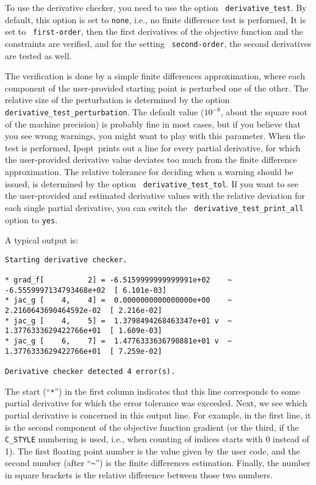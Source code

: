 \documentclass[10pt]{article}
\newcommand{\Ipopt}{{\sc Ipopt}}
\begin{document}
To use the derivative checker, you need to use the option {\tt
  derivative\_test}.  By default, this option is set to {\tt none},
i.e., no finite difference test is performed,  It is set to {\tt
  first-order}, then the first derivatives of the objective function
and the constraints are verified, and for the setting {\tt
  second-order}, the second derivatives are tested as well.

The verification is done by a simple finite differences approximation,
where each component of the user-provided starting point is perturbed
one of the other.  The relative size of the perturbation is determined
by the option {\tt derivative\_test\_perturbation}.  The default value
($10^{-8}$, about the square root of the machine precision) is
probably fine in most cases, but if you believe that you see wrong
warnings, you might want to play with this parameter.  When the test is
performed, \Ipopt\ prints out a line for every partial derivative, for
which the user-provided derivative value deviates too much from the
finite difference approximation.  The relative tolerance for deciding
when a warning should be issued, is determined by the option {\tt
  derivative\_test\_tol}.  If you want to see the user-provided and
estimated derivative values with the relative deviation for each
single partial derivative, you can switch the {\tt
  derivative\_test\_print\_all} option to {\tt yes}.

A typical output is:

\begin{footnotesize}
\begin{verbatim}
Starting derivative checker.

* grad_f[          2] = -6.5159999999999991e+02    ~ -6.5559997134793468e+02  [ 6.101e-03]
* jac_g [    4,    4] =  0.0000000000000000e+00    ~  2.2160643690464592e-02  [ 2.216e-02]
* jac_g [    4,    5] =  1.3798494268463347e+01 v  ~  1.3776333629422766e+01  [ 1.609e-03]
* jac_g [    6,    7] =  1.4776333636790881e+01 v  ~  1.3776333629422766e+01  [ 7.259e-02]

Derivative checker detected 4 error(s).
\end{verbatim}
\end{footnotesize}

The start (``\verb|*|'') in the first column indicates that this line
corresponds to some partial derivative for which the error tolerance
was exceeded.  Next, we see which partial derivative is concerned in
this output line.  For example, in the first line, it is the second
component of the objective function gradient (or the third, if the
{\tt C\_STYLE} numbering is used, i.e., when counting of indices
starts with 0 instead of 1).  The first floating point number is the
value given by the user code, and the second number (after
``\verb|~|'') is the finite differences estimation.  Finally, the
number in square brackets is the relative difference between those two
numbers.
\end{document}
